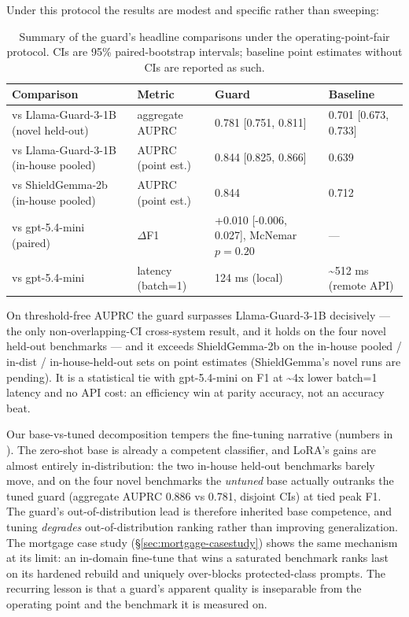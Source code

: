 \documentclass[sigconf,nonacm]{acmart}
\begin{document}
Under this protocol the results are modest and specific rather than sweeping:

\begin{table}[t]
\centering
\small
\caption{Summary of the guard's headline comparisons under the operating-point-fair protocol. CIs are 95\% paired-bootstrap intervals; baseline point estimates without CIs are reported as such.}
\label{tab:conclusion-summary}
\begin{tabular}{llll}
\toprule
Comparison & Metric & Guard & Baseline \\
\midrule
vs Llama-Guard-3-1B (novel held-out) & aggregate AUPRC & 0.781 [0.751, 0.811] & 0.701 [0.673, 0.733] \\
vs Llama-Guard-3-1B (in-house pooled) & AUPRC (point est.) & 0.844 [0.825, 0.866] & 0.639 \\
vs ShieldGemma-2b (in-house pooled) & AUPRC (point est.) & 0.844 & 0.712 \\
vs gpt-5.4-mini (paired) & $\Delta$F1 & +0.010 [-0.006, 0.027], McNemar $p=0.20$ & --- \\
vs gpt-5.4-mini & latency (batch=1) & 124 ms (local) & \textasciitilde{}512 ms (remote API) \\
\bottomrule
\end{tabular}
\end{table}

On threshold-free AUPRC the guard surpasses Llama-Guard-3-1B decisively --- the only non-overlapping-CI cross-system result, and it holds on the four novel held-out benchmarks --- and it exceeds ShieldGemma-2b on the in-house pooled / in-dist / in-house-held-out sets on point estimates (ShieldGemma's novel runs are pending). It is a statistical tie with gpt-5.4-mini on F1 at \textasciitilde{}4x lower batch=1 latency and no API cost: an efficiency win at parity accuracy, not an accuracy beat.

Our base-vs-tuned decomposition tempers the fine-tuning narrative (numbers in ). The zero-shot base is already a competent classifier, and LoRA's gains are almost entirely in-distribution: the two in-house held-out benchmarks barely move, and on the four novel benchmarks the \emph{untuned} base actually outranks the tuned guard (aggregate AUPRC 0.886 vs 0.781, disjoint CIs) at tied peak F1. The guard's out-of-distribution lead is therefore inherited base competence, and tuning \emph{degrades} out-of-distribution ranking rather than improving generalization. The mortgage case study (\S\ref{sec:mortgage-casestudy}) shows the same mechanism at its limit: an in-domain fine-tune that wins a saturated benchmark ranks last on its hardened rebuild and uniquely over-blocks protected-class prompts. The recurring lesson is that a guard's apparent quality is inseparable from the operating point and the benchmark it is measured on.
\end{document}
